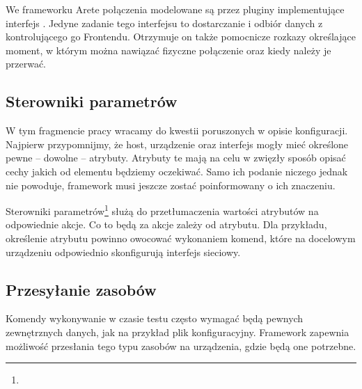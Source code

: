 \documentclass[00-praca-magisterska.tex]{subfiles}
\begin{document}
We frameworku Arete połączenia modelowane są przez pluginy implementujące
interfejs . Jedyne zadanie tego interfejsu to
dostarczanie i odbiór danych z kontrolującego go Frontendu. Otrzymuje on także
pomocnicze rozkazy określające moment, w którym można nawiązać fizyczne
połączenie oraz kiedy należy je przerwać.


\subsection{Sterowniki parametrów}

W tym fragmencie pracy wracamy do kwestii poruszonych w opisie konfiguracji.
Najpierw przypomnijmy, że host, urządzenie oraz interfejs mogły mieć określone
pewne -- dowolne -- atrybuty. Atrybuty te mają na celu w zwięzły sposób opisać
cechy jakich od elementu będziemy oczekiwać. Samo ich podanie niczego jednak nie
powoduje, framework musi jeszcze zostać poinformowany o ich znaczeniu.

Sterowniki parametrów\footnote{} służą do przetłumaczenia
wartości atrybutów na odpowiednie akcje. Co to będą za akcje zależy od atrybutu.
Dla przykładu, określenie atrybutu  powinno owocować wykonaniem komend,
które na docelowym urządzeniu odpowiednio skonfigurują interfejs sieciowy.


\subsection{Przesyłanie zasobów}

Komendy wykonywanie w czasie testu często wymagać będą pewnych zewnętrznych
danych, jak na przykład plik konfiguracyjny. Framework zapewnia możliwość
przesłania tego typu zasobów na urządzenia, gdzie będą one potrzebne.
\end{document}
